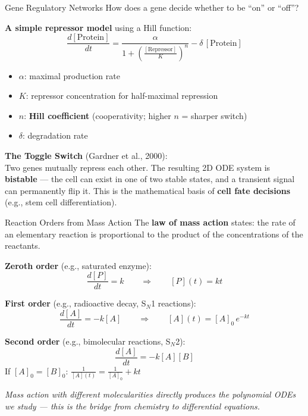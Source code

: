 \begin{frame}{Gene Regulatory Networks}
How does a gene decide whether to be ``on'' or ``off''?

\vspace{0.3cm}
\textbf{A simple repressor model} using a Hill function:
\[
\frac{d[\text{Protein}]}{dt} = \frac{\alpha}{1 + \left(\frac{[\text{Repressor}]}{K}\right)^n} - \delta\,[\text{Protein}]
\]

\begin{itemize}
    \item $\alpha$: maximal production rate
    \item $K$: repressor concentration for half-maximal repression
    \item $n$: \textbf{Hill coefficient} (cooperativity; higher $n$ = sharper switch)
    \item $\delta$: degradation rate
\end{itemize}

\vspace{0.3cm}
\textbf{The Toggle Switch} (Gardner et al., 2000): \\
Two genes mutually repress each other. The resulting 2D ODE system is \textbf{bistable} --- the cell can exist in one of two stable states, and a transient signal can permanently flip it. This is the mathematical basis of \textbf{cell fate decisions} (e.g., stem cell differentiation).
\end{frame}


\begin{frame}{Reaction Orders from Mass Action}
The \textbf{law of mass action} states: the rate of an elementary reaction is proportional to the product of the concentrations of the reactants.

\vspace{0.3cm}
\textbf{Zeroth order} (e.g., saturated enzyme):
\[
\frac{d[P]}{dt} = k \qquad \Rightarrow \qquad [P](t) = kt
\]

\textbf{First order} (e.g., radioactive decay, S$_N$1 reactions):
\[
\frac{d[A]}{dt} = -k[A] \qquad \Rightarrow \qquad [A](t) = [A]_0\, e^{-kt}
\]

\textbf{Second order} (e.g., bimolecular reactions, S$_N$2):
\[
\frac{d[A]}{dt} = -k[A][B]
\]
If $[A]_0 = [B]_0$: \;$\displaystyle \frac{1}{[A](t)} = \frac{1}{[A]_0} + kt$

\vspace{0.2cm}
\textit{Mass action with different molecularities directly produces the polynomial ODEs we study --- this is the bridge from chemistry to differential equations.}
\end{frame}


